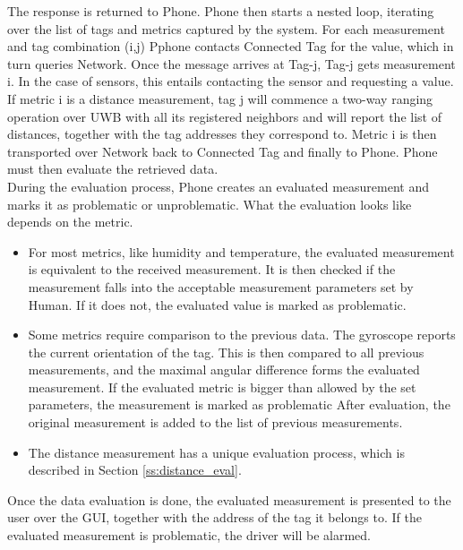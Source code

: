 The response is returned to Phone.
Phone then starts a nested loop, iterating over the list of tags and metrics captured by the system.
For each measurement and tag combination (i,j) Pphone contacts Connected Tag for the value, which in turn queries Network.
Once the message arrives at Tag-j, Tag-j gets measurement i. 
In the case of sensors, this entails contacting the sensor and requesting a value.
If metric i is a distance measurement, tag j will commence a two-way ranging operation over UWB with all its registered neighbors and will report the list of distances, together with the tag addresses they correspond to.
Metric i is then transported over Network back to Connected Tag and finally to Phone.
Phone must then evaluate the retrieved data. \\
During the evaluation process, Phone creates an evaluated measurement and marks it as problematic or unproblematic.
What the evaluation looks like depends on the metric.
\begin{itemize}
	\item For most metrics, like humidity and temperature, the evaluated measurement is equivalent to the received measurement. It is then checked if the measurement falls into the acceptable measurement parameters set by Human.
	If it does not, the evaluated value is marked as problematic.
	\item Some metrics require comparison to the previous data. The gyroscope reports the current orientation of the tag.
	This is then compared to all previous measurements, and the maximal angular difference forms the evaluated measurement.
	If the evaluated metric is bigger than allowed by the set parameters, the measurement is marked as problematic
	After evaluation, the original measurement is added to the list of previous measurements.
	\item The distance measurement has a unique evaluation process, which is described in Section \ref{ss:distance_eval}.
\end{itemize}
Once the data evaluation is done, the evaluated measurement is presented to the user over the GUI, together with the address of the tag it belongs to.
If the evaluated measurement is problematic, the driver will be alarmed.


